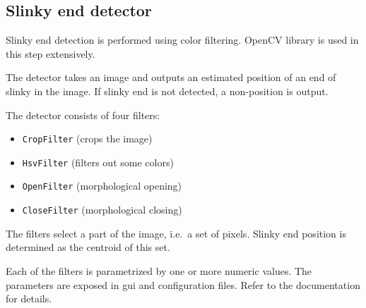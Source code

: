 

\subsection{Slinky end detector}
\label{sec:slinkyenddetector}

Slinky end detection is performed using color filtering.
OpenCV library is used in this step extensively.

The detector takes an image and outputs an estimated position
of an end of slinky in the image.
If slinky end is not detected, a non-position is output.

The detector consists of four filters:

\begin{itemize}
\item \texttt{CropFilter} (crops the image)
\item \texttt{HsvFilter} (filters out some colors)
\item \texttt{OpenFilter} (morphological opening)
\item \texttt{CloseFilter} (morphological closing)
\end{itemize}

The filters select a part of the image, i.e.~a set of pixels.
Slinky end position is determined as the centroid of this set.

Each of the filters is parametrized by one or more numeric values.
The parameters are exposed in \gls{gui} and configuration files.
Refer to the \slnkcctr{} documentation\cite{bartek:slnkcctrreadme}
for details.
